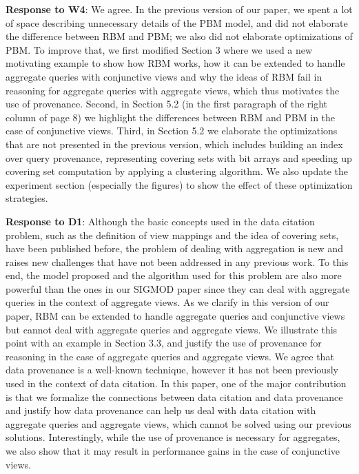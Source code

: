 \begin{appendix}
\textbf{Response to W4}:
We agree. In the previous version of our paper, we spent a lot of space describing unnecessary details of the PBM model, and did not elaborate the difference between RBM and PBM; we also did not elaborate optimizations of PBM. To improve that, we first modified Section 3 where we used a new motivating example to show how RBM works, how it can be extended to handle aggregate queries with conjunctive views and why the ideas of RBM fail in reasoning for aggregate queries with aggregate views, which thus motivates the use of provenance. Second, in Section 5.2 (in the first paragraph of the right column of page 8) we highlight the differences between RBM and PBM in the case of conjunctive views. Third, in Section 5.2 we elaborate the optimizations that are not presented in the previous version, which includes building an index over query provenance, representing covering sets with bit arrays and speeding up covering set computation by applying a clustering algorithm. We also update the experiment section (especially the figures) to show the effect of these optimization strategies. 


\textbf{Response to D1}:
Although the basic concepts used in the data citation problem, such as the definition of view mappings and the idea of covering sets, have been published before, the problem of dealing with aggregation is new and raises new challenges that have not been addressed in any previous work. To this end, the model proposed and the algorithm used for this problem are also more powerful than the ones in our SIGMOD paper since they can deal with aggregate queries in the context of aggregate views. As we clarify in this version of our paper, RBM can be extended to handle aggregate queries and conjunctive views but cannot deal with aggregate queries and aggregate views.  We illustrate this point with an example in Section 3.3, and justify the use of provenance for reasoning in the case of aggregate queries and aggregate views. 
We agree that data provenance is a well-known technique, however it has not been previously used in the context of data citation. In this paper, one of the major contribution is that we formalize the connections between data citation and data provenance and justify how data provenance can help us deal with data citation with aggregate queries and aggregate views, which cannot be solved using our previous solutions.  Interestingly, while the use of provenance is necessary for aggregates, we also show that it may result in performance gains in the case of conjunctive views. 


\end{appendix}
